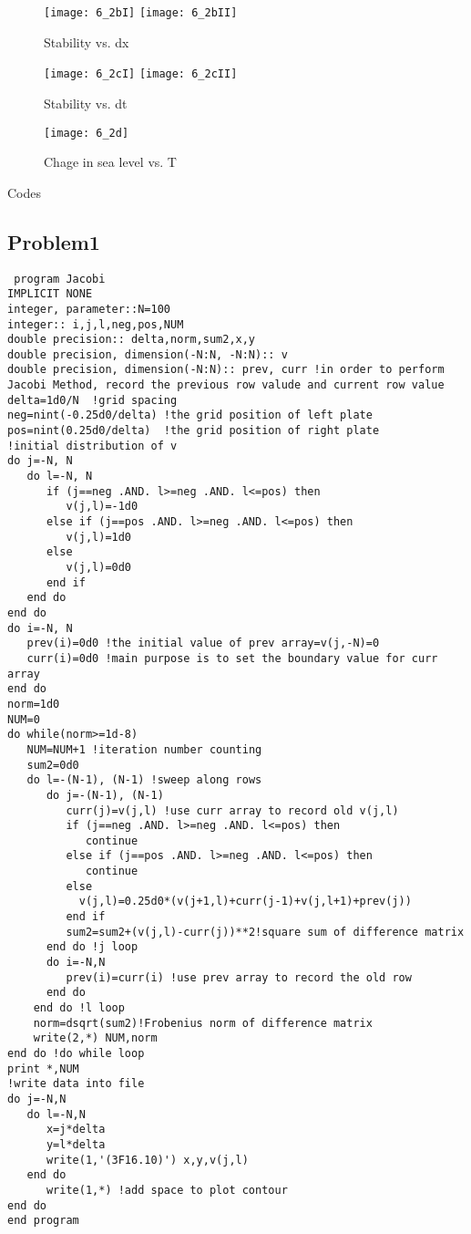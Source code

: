 \documentclass{article}
\begin{document}
\begin{figure} [ht]
\texttt{[image: 6\_2bI]}
\texttt{[image: 6\_2bII]}
\caption{Stability vs. dx}
\end{figure}

\begin{figure} [ht]
\texttt{[image: 6\_2cI]}
\texttt{[image: 6\_2cII]}
\caption{Stability vs. dt}
\end{figure}

\begin{figure} [ht]
\texttt{[image: 6\_2d]}
\caption{Chage in sea level vs. T}
\end{figure}


\newpage
\appendix
\begin{center} 
\LARGE{Codes}
\end{center}

\subsection*{Problem1}
 \begin{verbatim}
 program Jacobi
IMPLICIT NONE
integer, parameter::N=100
integer:: i,j,l,neg,pos,NUM
double precision:: delta,norm,sum2,x,y
double precision, dimension(-N:N, -N:N):: v
double precision, dimension(-N:N):: prev, curr !in order to perform Jacobi Method, record the previous row valude and current row value
delta=1d0/N  !grid spacing
neg=nint(-0.25d0/delta) !the grid position of left plate
pos=nint(0.25d0/delta)  !the grid position of right plate
!initial distribution of v
do j=-N, N
   do l=-N, N
      if (j==neg .AND. l>=neg .AND. l<=pos) then
         v(j,l)=-1d0
      else if (j==pos .AND. l>=neg .AND. l<=pos) then 
         v(j,l)=1d0
      else 
         v(j,l)=0d0 
      end if
   end do
end do
do i=-N, N
   prev(i)=0d0 !the initial value of prev array=v(j,-N)=0
   curr(i)=0d0 !main purpose is to set the boundary value for curr array
end do
norm=1d0
NUM=0
do while(norm>=1d-8)
   NUM=NUM+1 !iteration number counting
   sum2=0d0
   do l=-(N-1), (N-1) !sweep along rows
      do j=-(N-1), (N-1)
         curr(j)=v(j,l) !use curr array to record old v(j,l)
         if (j==neg .AND. l>=neg .AND. l<=pos) then
            continue
         else if (j==pos .AND. l>=neg .AND. l<=pos) then 
            continue
         else
           v(j,l)=0.25d0*(v(j+1,l)+curr(j-1)+v(j,l+1)+prev(j))
         end if
         sum2=sum2+(v(j,l)-curr(j))**2!square sum of difference matrix
      end do !j loop
      do i=-N,N
         prev(i)=curr(i) !use prev array to record the old row
      end do
    end do !l loop
    norm=dsqrt(sum2)!Frobenius norm of difference matrix
    write(2,*) NUM,norm
end do !do while loop
print *,NUM
!write data into file
do j=-N,N
   do l=-N,N
      x=j*delta
      y=l*delta
      write(1,'(3F16.10)') x,y,v(j,l)
   end do
      write(1,*) !add space to plot contour 
end do
end program 
\end{verbatim}
\end{document}
